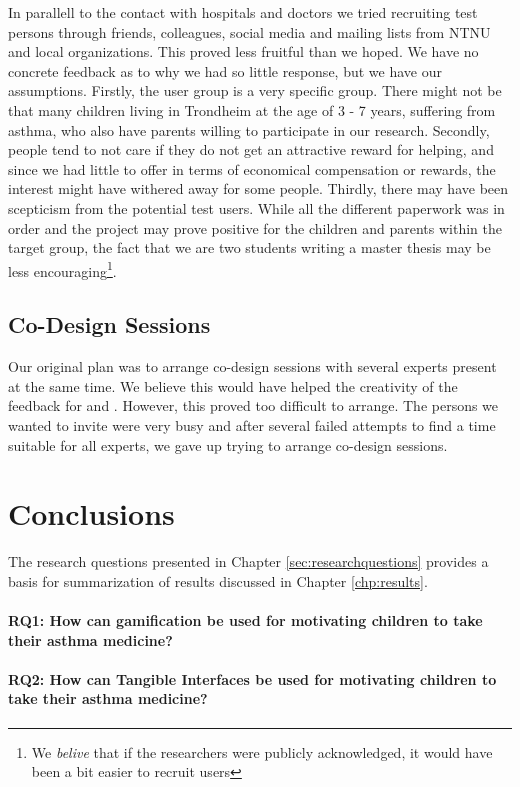 In parallell to the contact with hospitals and doctors we tried recruiting test persons through friends, colleagues, social media and mailing lists from NTNU and local organizations. This proved less fruitful than we hoped. We have no concrete feedback as to why we had so little response, but we have our assumptions. Firstly, the user group is a very specific group. There might not be that many children living in Trondheim at the age of 3 - 7 years, suffering from asthma, who also have parents willing to participate in our research. Secondly, people tend to not care if they do not get an attractive reward for helping, and since we had little to offer in terms of economical compensation or rewards, the interest might have withered away for some people. Thirdly, there may have been scepticism from the potential test users. While all the different paperwork was in order and the project may prove positive for the children and parents within the target group, the fact that we are two students writing a master thesis may be less encouraging\footnote{We \emph{belive} that if the researchers were publicly acknowledged, it would have been a bit easier to recruit users}.


\subsection{Co-Design Sessions}
\label{sec:codesignsessionsdifficulties}
Our original plan was to arrange co-design sessions with several experts present at the same time. We believe this would have helped the creativity of the feedback for \app{} and \ab{}. However, this proved too difficult to arrange. The persons we wanted to invite were very busy and after several failed attempts to find a time suitable for all experts, we gave up trying to arrange co-design sessions. 

  
\section{Conclusions}
\label{conlusions}

The research questions presented in Chapter \ref{sec:researchquestions} provides a basis for summarization of results discussed in Chapter \ref{chp:results}. 

\paragraph{RQ1: How can gamification be used for motivating children to take their asthma medicine?}



\paragraph{RQ2: How can Tangible Interfaces be used for motivating children to take their asthma medicine?}





